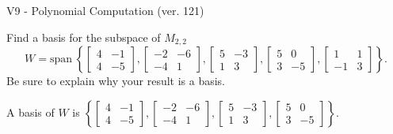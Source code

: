 \begin{exercise}
  \begin{exerciseTitle}V9 - Polynomial Computation (ver. 121)\end{exerciseTitle}
  \begin{exerciseStatement}
    Find a basis for the subspace of \(M_{2,2}\) 
\[W=\mathrm{span}\ \left\{\left[\begin{array}{cc}
4 & -1 \\
4 & -5
\end{array}\right] , \left[\begin{array}{cc}
-2 & -6 \\
-4 & 1
\end{array}\right] , \left[\begin{array}{cc}
5 & -3 \\
1 & 3
\end{array}\right] , \left[\begin{array}{cc}
5 & 0 \\
3 & -5
\end{array}\right] , \left[\begin{array}{cc}
1 & 1 \\
-1 & 3
\end{array}\right]\right\}.\]
 Be sure to explain why your result is a basis.


  \end{exerciseStatement}
  \begin{exerciseAnswer}
   A basis of \(W\) is  \(\left\{\left[\begin{array}{cc}
4 & -1 \\
4 & -5
\end{array}\right] , \left[\begin{array}{cc}
-2 & -6 \\
-4 & 1
\end{array}\right] , \left[\begin{array}{cc}
5 & -3 \\
1 & 3
\end{array}\right] , \left[\begin{array}{cc}
5 & 0 \\
3 & -5
\end{array}\right]\right\}\).
  


  \end{exerciseAnswer}
\end{exercise}